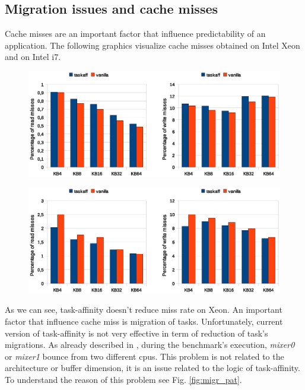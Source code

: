 \subsection{Migration issues and cache misses}

Cache misses are an important factor that influence predictability of an application. The following graphics visualize cache misses obtained on Intel 
Xeon and on Intel i7.

\begin{figure}[htbp]
 \centering
  \includegraphics[width=\widefigure]{images/cache_miss/l1_load_store_Xeon.eps}
  \label{fig:l1_load_store_Xeon}
 \caption{}
\end{figure}

\begin{figure}[htbp]
 \centering
  \includegraphics[width=\widefigure]{images/cache_miss/l1_load_store_i7.eps}
  \label{fig:l1_load_store_Xeon}
 \caption{}
\end{figure}

As we can see, task-affinity doesn't reduce miss rate on Xeon. An important factor that influence cache miss is migration of tasks. Unfortunately, current 
version of task-affinity is not very effective in term of reduction of task's migrations. As already described in \cite{lcs}, during the benchmark's 
execution, \textit{mixer0} or \textit{mixer1} bounce from two different cpus. This problem is not related to the architecture or buffer dimension, it is 
an issue related to the logic of task-affinity. To understand the reason of this problem see Fig. \ref{fig:migr_pat}. 

